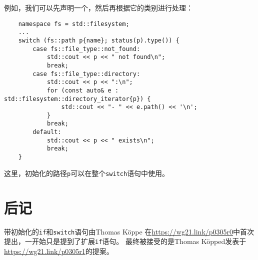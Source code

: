 例如，我们可以先声明一个，然后再根据它的类别进行处理：
\begin{lstlisting}
    namespace fs = std::filesystem;
    ...
    switch (fs::path p{name}; status(p).type()) {
        case fs::file_type::not_found:
            std::cout << p << " not found\n";
            break;
        case fs::file_type::directory:
            std::cout << p << ":\n";
            for (const auto& e : std::filesystem::directory_iterator{p}) {
                std::cout << "- " << e.path() << '\n';
            }
            break;
        default:
            std::cout << p << " exists\n";
            break;
    }
\end{lstlisting}
这里，初始化的路径\texttt{p}可以在整个\texttt{switch}语句中使用。

\section{后记}
带初始化的\texttt{if}和\texttt{switch}语句由Thomas Köppe
在\url{https://wg21.link/p0305r0}中首次提出，一开始只是提到了扩展\texttt{if}语句。
最终被接受的是Thomas Köpped发表于\url{https://wg21.link/p0305r1}的提案。